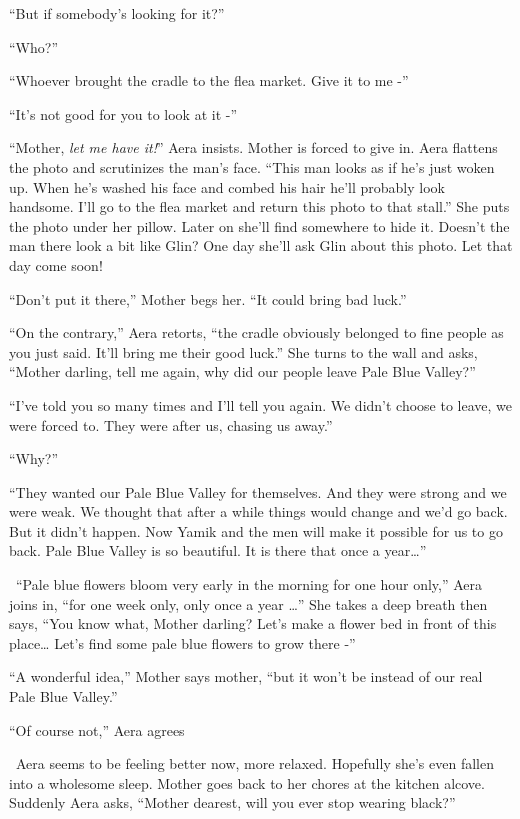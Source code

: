 \documentclass[twoside,11pt]{book}
\begin{document}
``But if somebody's looking for it?''

``Who?''

``Whoever brought the cradle to the flea market. Give it to me -''

``It's not good for you to look at it -''

``Mother, \textit{let me have it!}'' Aera insists. Mother is forced to give in. Aera flattens
the photo and scrutinizes the man's face. ``This man looks as if he's just woken up. When he's washed his
face and combed his hair he'll probably look handsome. I'll go to the flea market and return this photo to that
stall.'' She puts the photo under her pillow. Later on she'll find somewhere to hide it. Doesn't the man
there look a bit like Glin? One day she'll ask Glin about this photo. Let that day come soon!

``Don't put it there,'' Mother begs her. ``It could bring bad
luck.''

``On the contrary,'' Aera retorts, ``the cradle obviously belonged to fine people
as you just said. It'll bring me their good luck.'' She turns to the wall and asks, ``Mother
darling, tell me again, why did our people leave Pale Blue Valley?''

``I've told you so many times and I'll tell you again. We didn't choose to leave, we were forced to. They
were after us, chasing us away.''

``Why?''

``They wanted our Pale Blue Valley for themselves.  And they were strong and we were weak. We thought that
after a while things would change and we'd go back. But it didn't happen. Now Yamik and the men will make it possible
for us to go back. Pale Blue Valley is so beautiful. It is there that once a year{\dots}''

\ ``Pale blue flowers bloom very early in the morning for one hour only,'' Aera joins in, ``for one week
only, only once a year {\dots}'' She takes a deep breath then says, ``You know what, Mother
darling? Let's make a flower bed in front of this place{\dots} Let's find some pale blue flowers to grow there
-''

``A wonderful idea,'' Mother says mother, ``but it won't be instead of our real
Pale Blue Valley.''

``Of course not,'' Aera agrees

\ Aera seems to be feeling better now, more relaxed. Hopefully she's even fallen into a wholesome sleep. Mother goes
back to her chores at the kitchen alcove. Suddenly Aera asks, ``Mother dearest, will you ever stop wearing
black?''
\end{document}
